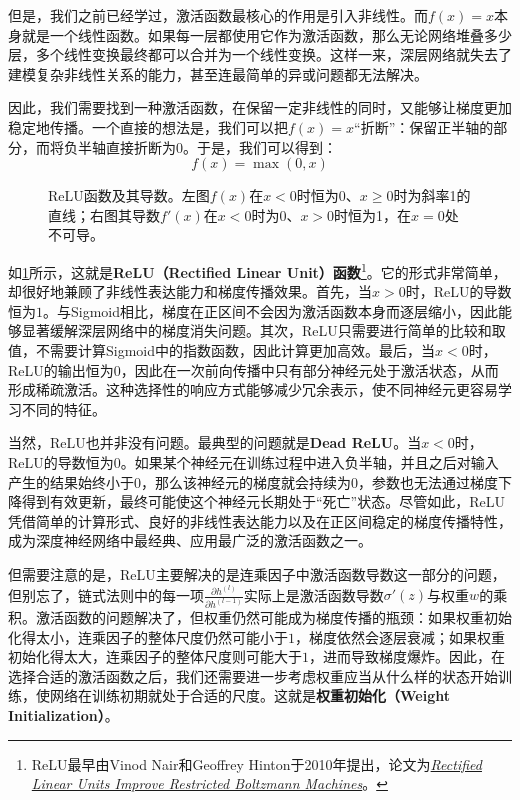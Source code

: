 但是，我们之前已经学过，激活函数最核心的作用是引入非线性。而$f(x)=x$本身就是一个线性函数。如果每一层都使用它作为激活函数，那么无论网络堆叠多少层，多个线性变换最终都可以合并为一个线性变换。这样一来，深层网络就失去了建模复杂非线性关系的能力，甚至连最简单的异或问题都无法解决。

因此，我们需要找到一种激活函数，在保留一定非线性的同时，又能够让梯度更加稳定地传播。一个直接的想法是，我们可以把$f(x)=x$“折断”：保留正半轴的部分，而将负半轴直接折断为$0$。于是，我们可以得到：
$$
f(x) = \max(0, x)
$$

\begin{figure}[H]
    \caption{ReLU函数及其导数。左图$f(x)$在$x<0$时恒为0、$x\geq 0$时为斜率1的直线；右图其导数$f'(x)$在$x<0$时为0、$x>0$时恒为1，在$x=0$处不可导。}
    \label{fig:relu}
\end{figure}

如\cref{fig:relu}所示，这就是\textbf{ReLU（Rectified Linear Unit）函数}\footnote{ReLU最早由Vinod Nair和Geoffrey Hinton于2010年提出，论文为\href{https://www.cs.toronto.edu/~fritz/absps/reluICML.pdf}{\textit{Rectified Linear Units Improve Restricted Boltzmann Machines}}。}。它的形式非常简单，却很好地兼顾了非线性表达能力和梯度传播效果。首先，当$x>0$时，ReLU的导数恒为$1$。与Sigmoid相比，梯度在正区间不会因为激活函数本身而逐层缩小，因此能够显著缓解深层网络中的梯度消失问题。其次，ReLU只需要进行简单的比较和取值，不需要计算Sigmoid中的指数函数，因此计算更加高效。最后，当$x<0$时，ReLU的输出恒为$0$，因此在一次前向传播中只有部分神经元处于激活状态，从而形成稀疏激活。这种选择性的响应方式能够减少冗余表示，使不同神经元更容易学习不同的特征。

当然，ReLU也并非没有问题。最典型的问题就是\textbf{Dead ReLU}。当$x<0$时，ReLU的导数恒为$0$。如果某个神经元在训练过程中进入负半轴，并且之后对输入产生的结果始终小于$0$，那么该神经元的梯度就会持续为$0$，参数也无法通过梯度下降得到有效更新，最终可能使这个神经元长期处于“死亡”状态。尽管如此，ReLU凭借简单的计算形式、良好的非线性表达能力以及在正区间稳定的梯度传播特性，成为深度神经网络中最经典、应用最广泛的激活函数之一。

但需要注意的是，ReLU主要解决的是连乘因子中激活函数导数这一部分的问题，但别忘了，链式法则中的每一项$\frac{\partial h^{(l)}}{\partial h^{(l-1)}}$实际上是激活函数导数$\sigma'(z)$与权重$w$的乘积。激活函数的问题解决了，但权重仍然可能成为梯度传播的瓶颈：如果权重初始化得太小，连乘因子的整体尺度仍然可能小于$1$，梯度依然会逐层衰减；如果权重初始化得太大，连乘因子的整体尺度则可能大于$1$，进而导致梯度爆炸。因此，在选择合适的激活函数之后，我们还需要进一步考虑权重应当从什么样的状态开始训练，使网络在训练初期就处于合适的尺度。这就是\textbf{权重初始化（Weight Initialization）}。

